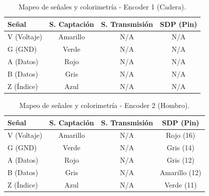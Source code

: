 \begin{table}[h]
	\centering
	\caption{Mapeo de señales y colorimetría - Encoder 1 (Cadera).}
	\renewcommand{\arraystretch}{1.5}
	\begin{tabular}{lccc}
		\toprule
		\textbf{Señal} & \textbf{S. Captación} & \textbf{S. Transmisión} & \textbf{SDP (Pin)} \\ \midrule
		V (Voltaje)    & Amarillo              & N/A                     & N/A                \\
		G (GND)        & Verde                 & N/A                     & N/A                \\
		A (Datos)      & Rojo                  & N/A                     & N/A                \\
		B (Datos)      & Gris                  & N/A                     & N/A                \\
		Z (Índice)     & Azul                  & N/A                     & N/A                \\ \bottomrule
	\end{tabular}
\end{table}

\begin{table}[h]
	\centering
	\caption{Mapeo de señales y colorimetría - Encoder 2 (Hombro).}
	\renewcommand{\arraystretch}{1.5}
	\begin{tabular}{lccc}
		\toprule
		\textbf{Señal} & \textbf{S. Captación} & \textbf{S. Transmisión} & \textbf{SDP (Pin)} \\ \midrule
		V (Voltaje)    & Amarillo              & N/A                     & Rojo (16)          \\
		G (GND)        & Verde                 & N/A                     & Gris (14)          \\
		A (Datos)      & Rojo                  & N/A                     & Gris (12)          \\
		B (Datos)      & Gris                  & N/A                     & Amarillo (12)      \\
		Z (Índice)     & Azul                  & N/A                     & Verde (11)         \\ \bottomrule
	\end{tabular}
\end{table}

